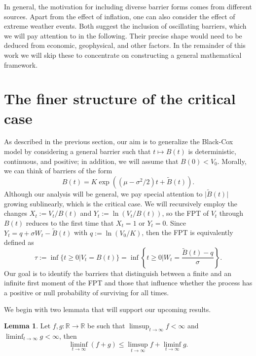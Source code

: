 \documentclass[12pt]{article}
\theoremstyle{definition}
\newtheorem{lemma}{Lemma}[theorem]
\begin{document}
In general, the motivation for including diverse barrier forms comes from different sources. Apart from the effect of inflation, one can also consider the effect of extreme weather events. Both suggest the inclusion of oscillating barriers, which we will pay attention to in the following. Their precise shape would need to be deduced from economic, geophysical, and other factors. In the remainder of this work we will skip these to concentrate on constructing a general mathematical framework.

\section{The finer structure of the critical case}

\label{sec:main_FPT}
As described in the previous section, our aim is to generalize the Black-Cox model by considering a general barrier such that $t \mapsto B(t)$ is deterministic, continuous, and positive; in addition, we will assume that $B(0) < V_0$. Morally, we can think of barriers of the form
$$B(t)=K\exp((\mu-\sigma^2/2)t+\tilde{B}(t)).$$
Although our analysis will be general, we pay special attention to $\vert\tilde{B}(t)\vert$ growing sublinearly, which is the critical case. We will recursively employ the changes $X_t := V_t/B(t)$ and $Y_t := \ln(V_t/B(t))$, so the FPT of $V_t$ through $B(t)$ reduces to the first time that $X_t=1$ or $Y_t=0$. Since
$Y_t=q+\sigma W_t-\tilde{B}(t)$ with $q:=\ln(V_0/K)$, then the FPT is equivalently defined as
$$
\tau:=\inf\lbrace t\geq 0\vert V_t=B(t)\rbrace=\inf \left\lbrace t\geq 0 \Bigg\vert W_t=\frac{\tilde{B}(t)-q}{\sigma} \right\rbrace.
$$
Our goal is to identify the barriers that distinguish between a finite and an infinite first moment of the FPT and those that influence whether the process has a positive or null probability of surviving for all times.

We begin with two lemmata that will support our upcoming results.

\begin{lemma}\label{llinf}
Let $f,g:\mathbb{R} \longrightarrow \mathbb{R}$ be such that $\limsup_{t \to \infty} f < \infty$ and $\liminf_{t \to \infty} g < \infty$, then
$$
\liminf_{t \to \infty} (f+g) \le \limsup_{t \to \infty} f + \liminf_{t \to \infty} g.
$$
\end{lemma}
\end{document}
